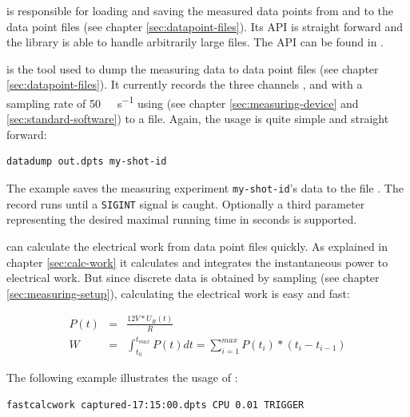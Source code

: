 \label{sec:special-developments}


\JWlfour{\JWTlibdp{}}

\JWTlibdp{} is responsible for loading and saving the measured data points from
and to the data point files (see chapter \ref{sec:datapoint-files}). Its API is
straight forward and the library is able to handle arbitrarily large files. The
API can be found in .


\JWlfour{\JWTdd{}}

\JWTdd{} is the tool used to dump the measuring data to data point files (see
chapter \ref{sec:datapoint-files}). It currently records the three channels
,  and  with a sampling rate of
\SI{50}{\kilo\samples\per\second} using \JWTnidaqmxbase{} (see chapter
\ref{sec:measuring-device} and \ref{sec:standard-software}) to a file.
Again, the usage is quite simple and straight forward:

\begin{lstlisting}[style=Shell]
datadump out.dpts my-shot-id
\end{lstlisting}

The example saves the measuring experiment \texttt{my-shot-id}'s data to the
file . The record runs until a \texttt{SIGINT} signal is
caught. Optionally a third parameter representing the desired maximal running
time in seconds is supported.


\JWlfour{\JWTfcw{}}

\JWTfcw{} can calculate the electrical work from data point files quick\-ly. As
explained in chapter \ref{sec:calc-work} it calculates and integrates the
instantaneous power to electrical work. But since discrete data is obtained by
sampling (see chapter \ref{sec:measuring-setup}), calculating the electrical
work is easy and fast:

\begin{eqnarray}
P(t) & = & \frac{12V * U_R(t)}{R} \\
W & = & \int_{t_0}^{t_{max}} P(t)dt = \sum_{i=1}^{max}P(t_i)*(t_i-t_{i-1})
\end{eqnarray}

The following example illustrates the usage of \JWTfcw{}:

\begin{lstlisting}[style=Shell]
fastcalcwork captured-17:15:00.dpts CPU 0.01 TRIGGER
\end{lstlisting}

